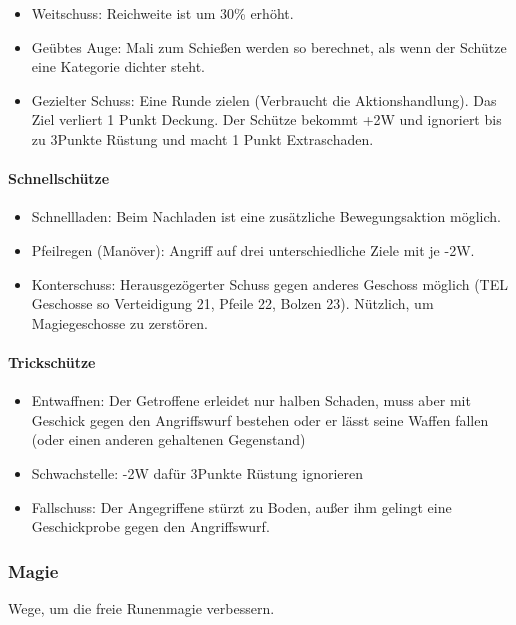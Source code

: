 \documentclass{article}
\begin{document}
\begin{itemize}
\item Weitschuss: Reichweite ist um 30\% erhöht.
\item Geübtes Auge: Mali zum Schießen werden so berechnet, als wenn der Schütze eine Kategorie dichter steht.
\item Gezielter Schuss: Eine Runde zielen (Verbraucht die Aktionshandlung). Das Ziel verliert 1 Punkt Deckung. Der Schütze bekommt +2W und ignoriert bis zu 3Punkte Rüstung und macht 1 Punkt Extraschaden.
\end{itemize}

\paragraph{Schnellschütze}

\begin{itemize}
\item Schnellladen: Beim Nachladen ist eine zusätzliche Bewegungsaktion möglich.
\item Pfeilregen (Manöver): Angriff auf drei unterschiedliche Ziele mit je -2W.
\item Konterschuss: Herausgezögerter Schuss gegen anderes Geschoss möglich (TEL Geschosse so Verteidigung 21, Pfeile 22, Bolzen 23). Nützlich, um Magiegeschosse zu zerstören.
\end{itemize}

\paragraph{Trickschütze}

\begin{itemize}
\item Entwaffnen: Der Getroffene erleidet nur halben Schaden, muss aber mit Geschick gegen den Angriffswurf bestehen oder er lässt seine Waffen fallen (oder einen anderen gehaltenen Gegenstand)
\item Schwachstelle: -2W dafür 3Punkte Rüstung ignorieren
\item Fallschuss: Der Angegriffene stürzt zu Boden, außer ihm gelingt eine Geschickprobe gegen den Angriffswurf.
\end{itemize}

\subsubsection{Magie}

Wege, um die freie Runenmagie verbessern.
\end{document}
